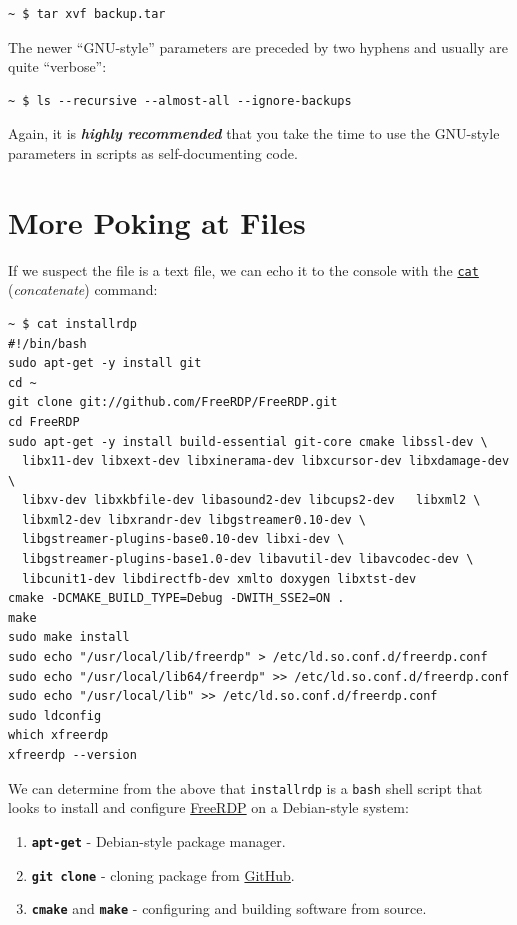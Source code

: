 \documentclass[10pt,]{book}
\numberwithin{figure}{chapter}
\begin{document}
\begin{verbatim}
~ $ tar xvf backup.tar
\end{verbatim}

The newer ``GNU-style'' parameters are preceded by two hyphens and
usually are quite ``verbose'':

\begin{verbatim}
~ $ ls --recursive --almost-all --ignore-backups
\end{verbatim}

Again, it is \textbf{\emph{highly recommended}} that you take the time
to use the GNU-style parameters in scripts as self-documenting code.

\section{More Poking at Files}\label{more-poking-at-files}

If we suspect the file is a text file, we can echo it to the console
with the \href{http://linux.die.net/man/1/cat}{\texttt{cat}}
(\emph{concatenate}) command:

\begin{verbatim}
~ $ cat installrdp 
#!/bin/bash
sudo apt-get -y install git
cd ~
git clone git://github.com/FreeRDP/FreeRDP.git
cd FreeRDP
sudo apt-get -y install build-essential git-core cmake libssl-dev \
  libx11-dev libxext-dev libxinerama-dev libxcursor-dev libxdamage-dev \
  libxv-dev libxkbfile-dev libasound2-dev libcups2-dev   libxml2 \
  libxml2-dev libxrandr-dev libgstreamer0.10-dev \
  libgstreamer-plugins-base0.10-dev libxi-dev \
  libgstreamer-plugins-base1.0-dev libavutil-dev libavcodec-dev \
  libcunit1-dev libdirectfb-dev xmlto doxygen libxtst-dev
cmake -DCMAKE_BUILD_TYPE=Debug -DWITH_SSE2=ON .
make
sudo make install
sudo echo "/usr/local/lib/freerdp" > /etc/ld.so.conf.d/freerdp.conf
sudo echo "/usr/local/lib64/freerdp" >> /etc/ld.so.conf.d/freerdp.conf
sudo echo "/usr/local/lib" >> /etc/ld.so.conf.d/freerdp.conf
sudo ldconfig
which xfreerdp
xfreerdp --version
\end{verbatim}

We can determine from the above that \texttt{installrdp} is a
\texttt{bash} shell script that looks to install and configure
\href{https://github.com/FreeRDP/FreeRDP}{FreeRDP} on a Debian-style
system:

\begin{enumerate}
\def\labelenumi{\arabic{enumi}.}
\item
  \textbf{\texttt{apt-get}} - Debian-style package manager.
\item
  \textbf{\texttt{git clone}} - cloning package from
  \href{http://github.com}{GitHub}.
\item
  \textbf{\texttt{cmake}} and \textbf{\texttt{make}} - configuring and
  building software from source.
\end{enumerate}
\end{document}
